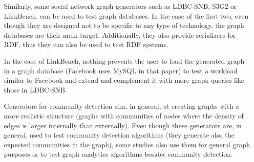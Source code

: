 Similarly, some social network graph generators such as LDBC-SNB, S3G2 or
LinkBench, can be used to test graph databases. In the case of the first two,
even though they are designed not to be specific to any type of technology,
the graph databases are their main target.  Additionally, they also provide serializers for
RDF, thus they can also be used to test RDF systems.

In the case of LinkBench, nothing prevents the user to load the generated graph
in a graph database (Facebook uses MySQL in that paper) to
test a workload similar to Facebook and extend and complement it with more
graph queries like those in LDBC-SNB.

Generators for community detection aim, in general, at creating graphs with a
more realistic structure (graphs with communities of nodes where the density of
edges is larger internally than externally). Even though these generators are,
in general, used to test community detection algorithms (they generate also the
expected communities in the graph), some studies also use them for general graph
purposes or to test graph analytics algorithms besides community detection.
